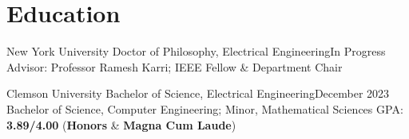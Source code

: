 \section{\textbf{Education}}
\vspace{-0.4mm}
\resumeSubHeadingListStart

\resumePhDSubheading
{New York University}{}
{Doctor of Philosophy, Electrical Engineering}{In Progress}
{Advisor: Professor Ramesh Karri; IEEE Fellow \& Department Chair}

\resumeBSSubheading
{Clemson University}{}
{Bachelor of Science, Electrical Engineering}{December 2023}
{Bachelor of Science, Computer Engineering; Minor, Mathematical Sciences}
{GPA: \textbf{3.89/4.00} (\textbf{Honors} \& \textbf{Magna Cum Laude})}

\resumeSubHeadingListEnd
\vspace{-6mm}
